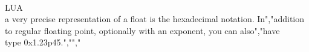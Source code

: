 \\LUA\\ a very precise representation of a float is the hexadecimal notation. In","addition to regular floating point, optionally with an exponent, you can also","have \\type {0x1.23p45}.","","%